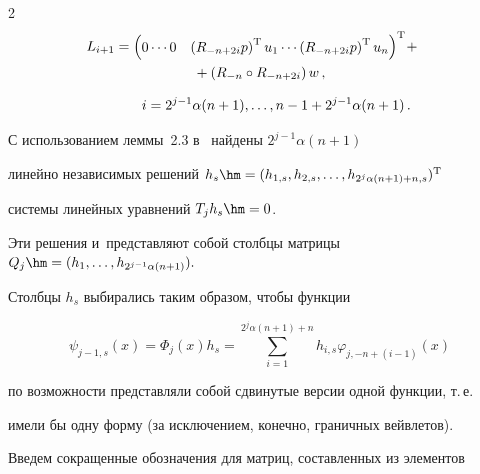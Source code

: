 \begin{multicols}{2}
\begin{multline*}
\hspace*{-8.5727pt}{L}_{i+1}=\begin{pmatrix} 


0 \cdots 0&\left(R_{-n+2i}{p}\right)^{\mathrm{T}} {u}_1 


\cdots \left(R_{-n+2i}{p}\right)^{\mathrm{T}}{u}_n


\end{pmatrix}^{\mathrm{T}}\!  


+{}\\


{}+\left(R_{-n}\circ R_{-n+2i}\right){w}\,,


\end{multline*}





\vspace*{-12pt}





\noindent


$$


\hspace*{8mm}i=2^{j-1}\alpha (n+1),\dots,n-1+2^{j-1}\alpha (n+1)\,.


$$





С использованием леммы~2.3  в~\cite{Yurgu} найдены $2^{j-1}\alpha (n+1)$ 


линейно независимых решений ${h}_s\hm=


(h_{1,s},h_{2,s},\dots,h_{2^j\alpha (n+1)+n,s})^{\mathrm{T}}$ 


системы линейных уравнений  ${T}_j {h}_s\hm=0$. 


Эти решения и~представляют собой столбцы матрицы ${Q}_j\hm=


({h}_1,\dots,{h}_{2^{j-1}\alpha (n+1)}).$


Столбцы ${h}_{s} $ выбирались таким образом, чтобы функции


$$


\psi _{j-1,s} (x)=\Phi_j(x){h}_s=


\sum\limits_{i=1}^{2^{j} \alpha (n+1)+n}h_{i,s}  \varphi _{j,-n+(i-1)}(x)


$$


по возможности представляли собой сдвинутые версии одной функции, т.\,е.\ 


имели бы одну форму (за исключением, конечно, граничных вейвлетов).  


Введем сокращенные обозначения для матриц, составленных из элементов



\end{multicols}
